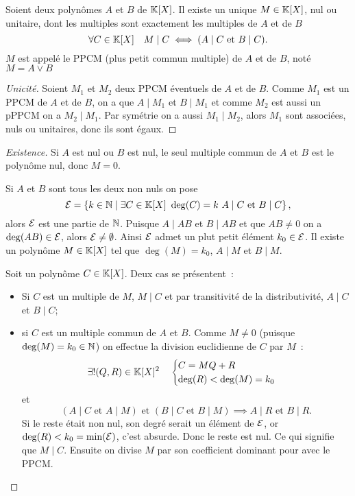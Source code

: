 \begin{prop}
  Soient deux polynômes $A$ et $B$ de $\mathbb{K}[X]$. Il existe un unique $M \in \mathbb{K}[X]$, nul ou unitaire, dont les multiples sont exactement les multiples de $A$ et de $B$
  \begin{equation}
    \forall C \in \mathbb{K}[X] \quad M\mid{}C \iff (A\mid{}C \text{~et~} B\mid{}C).
  \end{equation}
  $M$ est appelé le PPCM (plus petit commun multiple) de $A$ et de $B$, noté $M=A \vee B$
\end{prop}
\begin{proof}[Unicité]
  Soient $M_1$ et $M_2$ deux PPCM éventuels de $A$ et de $B$. Comme $M_1$ est un PPCM de $A$ et de $B$, on a que $A\mid{}M_1$ et $B\mid{}M_1$ et comme $M_2$ est aussi un pPPCM on a $M_2\mid{}M_1$. Par symétrie on a aussi $M_1\mid{}M_2$, alors $M_1$ sont associées, nuls ou unitaires, donc ils sont égaux.
\end{proof}
\begin{proof}[Existence]
  Si $A$ est nul ou $B$ est nul, le seul multiple commun de $A$ et $B$ est le polynôme nul, donc $M=0$.

  Si $A$ et $B$ sont tous les deux non nuls on pose
  \begin{equation}
    \E=\enstq{k \in \N}{\exists C \in \K[X] \ \deg(C)=k \ A\mid{}C \text{~et~} B\mid{}C},
  \end{equation}
  alors $\mathcal{E}$ est une partie de $\mathbb{N}$. Puisque $A\mid{}AB$ et $B\mid{}AB$ et que $AB \neq 0$ on a $\deg(AB) \in \mathcal{E}$, alors $\mathcal{E}\neq \emptyset$. Ainsi $\mathcal{E}$ admet un plut petit élément $k_0 \in \mathcal{E}$. Il existe un polynôme $M \in \mathbb{K}[X]$ tel que $\deg(M)=k_0$, $A\mid{}M$ et $B\mid{}M$.

  Soit un polynôme $C \in \mathbb{K}[X]$. Deux cas se présentent~:
  \begin{itemize}
  \item Si $C$ est un multiple de $M$, $M\mid{}C$ et par transitivité de la distributivité, $A\mid{}C$ et $B\mid{}C$;
  \item si $C$ est un multiple commun de $A$ et $B$. Comme $M \neq 0$ (puisque $\deg(M)=k_0 \in \mathbb{N}$) on effectue la division euclidienne de $C$ par $M$~:
    \begin{equation}
      \exists! (Q,R) \in \mathbb{K}[X]^2 \quad \begin{cases} C=MQ+R \\ \deg(R) < \deg(M)=k_0 \end{cases}
    \end{equation}
    et
    \begin{equation}
      (A\mid{}C \text{~et~} A\mid{}M) \text{~et~} (B\mid{}C \text{~et~} B\mid{}M) \implies A\mid{}R \text{~et~} B\mid{}R.
    \end{equation}
    Si le reste était non nul, son degré serait un élément de $\mathcal{E}$, or $\deg(R) < k_0 = \min(\mathcal{E})$, c'est absurde. Donc le reste est nul. Ce qui signifie que $M\mid{}C$. Ensuite on divise $M$ par son coefficient dominant pour avec le PPCM.
  \end{itemize}
\end{proof}

